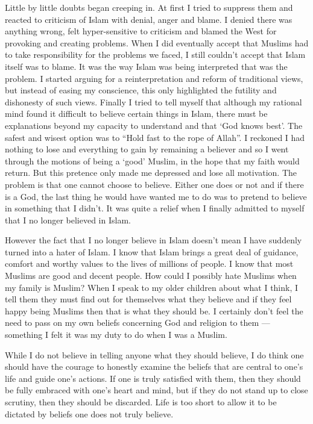 \documentclass[12pt]{memoir}
\begin{document}
Little by little doubts began creeping in.
At first I tried to suppress them
and reacted to criticism of Islam with denial, anger and blame.
I denied there was anything wrong, felt hyper-sensitive
to criticism and blamed the West for provoking and creating problems.
When I did eventually accept that Muslims had to take responsibility
for the problems we faced,
I still couldn’t accept that Islam itself was to blame.
It was the way Islam was being interpreted that was the problem.
I started arguing for a reinterpretation and reform of traditional views,
but instead of easing my conscience,
this only highlighted the futility and dishonesty of such views.
Finally I tried to tell myself that although my rational mind
found it difficult to believe certain things in Islam,
there must be explanations beyond my capacity to understand
and that ‘God knows best’.
The safest and wisest option was to “Hold fast to the rope of Allah”.
I reckoned I had nothing to lose and everything to gain by remaining a believer
and so I went through the motions of being a ‘good’ Muslim,
in the hope that my faith would return.
But this pretence only made me depressed and lose all motivation.
The problem is that one cannot choose to believe.
Either one does or not and if there is a God,
the last thing he would have wanted me to do
was to pretend to believe in something that I didn’t.
It was quite a relief when I finally admitted to myself
that I no longer believed in Islam.

However the fact that I no longer believe in Islam
doesn’t mean I have suddenly turned into a hater of Islam.
I know that Islam brings a great deal of guidance,
comfort and worthy values to the lives of millions of people.
I know that most Muslims are good and decent people.
How could I possibly hate Muslims when my family is Muslim?
When I speak to my older children about what I think,
I tell them they must find out for themselves what they believe
and if they feel happy being Muslims then that is what they should be.
I certainly don’t feel the need to pass on my own beliefs
concerning God and religion to them —
something I felt it was my duty to do when I was a Muslim.

While I do not believe in telling anyone what they should believe,
I do think one should have the courage to honestly examine
the beliefs that are central to one’s life and guide one’s actions.
If one is truly satisfied with them,
then they should be fully embraced with one’s heart and mind,
but if they do not stand up to close scrutiny,
then they should be discarded.
Life is too short to allow it to be dictated
by beliefs one does not truly believe.
\end{document}
